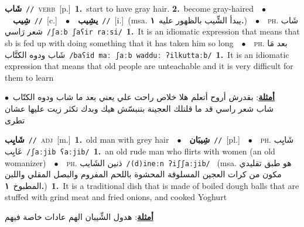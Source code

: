 \documentclass[10pt,a4paper,twoside]{article} %
\begin{document}
\begin{multicols}{2}
{\setlength\topsep{0pt}\textbf{\foreignlanguage{arabic}{شَاب}}\ {\color{gray}\texttt{//}\color{black}}\ \textsc{verb}\ [p.]\ \textbf{1.}~start to have gray hair.  \textbf{2.}~become gray-haired\ \ $\bullet$\ \ \setlength\topsep{0pt}\textbf{\foreignlanguage{arabic}{شِيب}}\ {\color{gray}\texttt{//}\color{black}}\ [c.]\ \ $\bullet$\ \ \setlength\topsep{0pt}\textbf{\foreignlanguage{arabic}{يشِيب}}\ {\color{gray}\texttt{//}\color{black}}\ [i.]\ \color{gray}(msa. \foreignlanguage{arabic}{يبدأ الشِّيب بالظهور عليه}~\foreignlanguage{arabic}{\textbf{١.}})\color{black}\ \ $\bullet$\ \ \textsc{ph.} \color{gray} \foreignlanguage{arabic}{شَاب شعر رَاسي}\color{black}\ {\color{gray}\texttt{/{\sffamily ʃaːb ʃaʕir raːsi}/}\color{black}}\ \textbf{1.}~It is an idiomatic expression that means that sb is fed up with doing something that it has taken him so long\ \ $\bullet$\ \ \textsc{ph.} \color{gray} \foreignlanguage{arabic}{بعد مَا شَاب ودوه الكتَّاب}\color{black}\ {\color{gray}\texttt{/{\sffamily baʕid maː ʃaːb wadduː ʔilkuttaːb}/}\color{black}}\ \textbf{1.}~It is an idiomatic expression that means that old people are unteachable and it is very difficult for them to learn\  \begin{flushright}\color{gray}\foreignlanguage{arabic}{\textbf{\underline{\foreignlanguage{arabic}{أمثلة}}}: بقدرش أروح أتعلم هلا خلاص راحت علي يعني بعد ما شاب ودوه الكتّاب\ $\bullet$\ \  شاب شعر راسي قد ما قلتلك العجينة بتنبسّش هيك وبدك تكثر زيت عليها عشان تطرى}\end{flushright}\color{black}} \vspace{2mm}

{\setlength\topsep{0pt}\textbf{\foreignlanguage{arabic}{شَايِب}}\ {\color{gray}\texttt{//}\color{black}}\ \textsc{adj}\ [m.]\ \textbf{1.}~old man with grey hair\ \ $\bullet$\ \ \setlength\topsep{0pt}\textbf{\foreignlanguage{arabic}{شِيبَان}}\ {\color{gray}\texttt{//}\color{black}}\ [pl.]\ \ $\bullet$\ \ \textsc{ph.} \color{gray} \foreignlanguage{arabic}{شَايِب عَايِب}\color{black}\ {\color{gray}\texttt{/{\sffamily ʃaːjib ʕaːjib}/}\color{black}}\ \textbf{1.}~an old rude man who flirts with women (an old womanizer)\ \ $\bullet$\ \ \textsc{ph.} \color{gray} \foreignlanguage{arabic}{ذنين الشَايب}\color{black}\ {\color{gray}\texttt{/{\sffamily (d)ineːn ʔiʃʃaːjib}/}\color{black}}\ \color{gray} (msa. \foreignlanguage{arabic}{هو طبق تقليدي مكون من كرات العجين المسلوقة المحشوة باللحم المفروم والبصل المقلي واللبن المطبوخ}~\foreignlanguage{arabic}{\textbf{١.}})\color{black}\ \textbf{1.}~It is a traditional dish that is made of boiled dough balls that are stuffed with grind meat and fried onions, and cooked Yoghurt\  \begin{flushright}\color{gray}\foreignlanguage{arabic}{\textbf{\underline{\foreignlanguage{arabic}{أمثلة}}}: هدول الشِّيبان الهم عادات خاصة فيهم}\end{flushright}\color{black}} \vspace{2mm}


\end{multicols}
\end{document}
